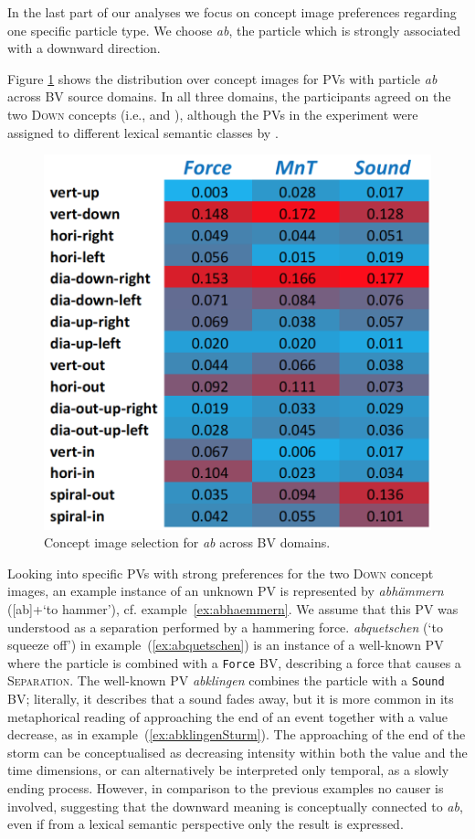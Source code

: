 \documentclass[output=paper]{langsci/langscibook}
\begin{document}
In the last part of our analyses we focus on concept image preferences
regarding one specific particle type. We choose \textit{ab}, the
particle which is strongly associated with a downward direction.

Figure \ref{fig:particle-prop-domain-ab} shows the distribution over
concept images for PVs with particle \textit{ab} across BV source
domains. In all three domains, the participants agreed on the two
\textsc{Down} concepts (i.e.,  and
), although the PVs in the experiment were
assigned to different lexical semantic classes by \cite{Kliche:11}.

\begin{figure}[htbp]
  \caption{Concept image selection for \textit{ab} across BV domains.}
  \label{fig:particle-prop-domain-ab}
  \includegraphics[width=0.55\linewidth]{figures/dataset_particles_domains_ab}
\end{figure}

Looking into specific PVs with strong preferences for the two
\textsc{Down} concept images, an example instance of an unknown PV is represented
by \textit{abhämmern} ([ab]+`to hammer'),
cf. example~\ref{ex:abhaemmern}. We assume that this PV was understood
as a separation performed by a hammering force. \textit{abquetschen}
(`to squeeze off') in example~(\ref{ex:abquetschen}) is an instance of
a well-known PV where the particle is combined with a \texttt{Force}
BV, describing a force that causes a \textsc{Separation}. The
well-known PV \textit{abklingen} combines the particle with a
\texttt{Sound} BV; literally, it describes that a sound fades away,
but it is more common in its metaphorical reading of approaching the
end of an event together with a value decrease, as in
example~(\ref{ex:abklingenSturm}). The approaching of the end of the
storm can be conceptualised as decreasing intensity within both the
value and the time dimensions, or can alternatively be interpreted
only temporal, as a slowly ending process. However, in comparison to
the previous examples no causer is involved, suggesting that the
downward meaning is conceptually connected to \textit{ab}, even if
from a lexical semantic perspective only the result is expressed.
\end{document}
